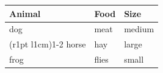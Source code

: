 \documentclass{article}
\begin{document}
	\begin{tabular}{@{} lll@{}}
		\toprule[2pt]
		Animal & Food  & Size   \\
		\midrule[1pt]
		dog    & meat  & medium \\
		\cmidrule[0.5pt](r{1pt} l{1cm}){1-2}
		horse  & hay   & large  \\
		frog   & flies & small  \\
		\bottomrule[2pt]
	\end{tabular}
\end{document}
